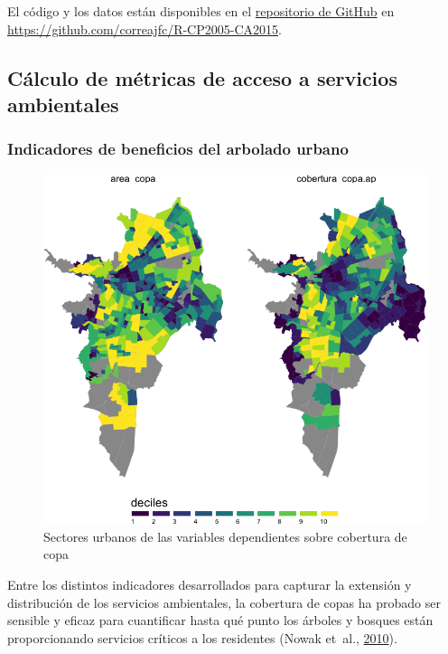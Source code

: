 \documentclass[12pt,a4paper,openany]{book}
\theoremstyle{definition}
\theoremstyle{definition}
\theoremstyle{definition}
\theoremstyle{remark}
\begin{document}
El código y los datos están disponibles en el
\href{https://github.com/correajfc/R-CP2005-CA2015}{repositorio de
GitHub} en \url{https://github.com/correajfc/R-CP2005-CA2015}.

\subsection{Cálculo de métricas de acceso a servicios
ambientales}\label{cuxe1lculo-de-muxe9tricas-de-acceso-a-servicios-ambientales}

\subsubsection{Indicadores de beneficios del arbolado
urbano}\label{indicadores-de-beneficios-del-arbolado-urbano}

\begin{figure}[H]

{\centering \includegraphics[width=0.8\linewidth]{tesis-unigis_files/figure-latex/mapa-copa-dep-1} 

}

\caption{Sectores urbanos de las variables dependientes sobre cobertura de copa}\label{fig:mapa-copa-dep}
\end{figure}

Entre los distintos indicadores desarrollados para capturar la extensión
y distribución de los servicios ambientales, la cobertura de copas ha
probado ser sensible y eficaz para cuantificar hasta qué punto los
árboles y bosques están proporcionando servicios críticos a los
residentes (Nowak et~al.,
\protect\hyperlink{ref-nowak_sustaining_2010}{2010}).
\end{document}
